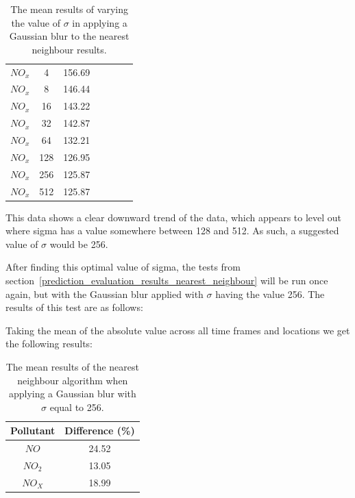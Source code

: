 \begin{table}[H]
\begin{tabular}{|c|c|c|c|c|c|c|}
						$NO_{x}$ & 4 & 156.69 \\
						$NO_{x}$ & 8 & 146.44 \\
						$NO_{x}$ & 16 & 143.22 \\
						$NO_{x}$ & 32 & 142.87 \\
						$NO_{x}$ & 64 & 132.21 \\
						$NO_{x}$ & 128 & 126.95 \\
						$NO_{x}$ & 256 & 125.87 \\
						$NO_{x}$ & 512 & 125.87 \\ \hline
					\end{tabular}
					\caption{The mean results of varying the value of $\sigma$ in applying a Gaussian blur to the nearest neighbour results.}
					\label{tab:nearest_neighbour_convolution_sigma_results}
				\end{table}
			\fi


			This data shows a clear downward trend of the data, which appears to level out where sigma has a value somewhere between 128 and 512. As such, a suggested value of $\sigma$ would be 256. 

			After finding this optimal value of sigma, the tests from section~\ref{prediction_evaluation_results_nearest_neighbour} will be run once again, but with the Gaussian blur applied with $\sigma$ having the value 256. The results of this test are as follows:


			Taking the mean of the absolute value across all time frames and locations we get the following results:

			\begin{table}[H]
				\centering
	    		\begin{tabular}{|c|c|}
	    			\hline
					Pollutant & Difference (\%) \\ \hline
					$NO$ & 24.52 \\
					$NO_{2}$ & 13.05 \\
					$NO_{X}$ & 18.99 \\
					\hline 
				\end{tabular}
				\caption{The mean results of the nearest neighbour algorithm when applying a Gaussian blur with $\sigma$ equal to 256.}
				\label{tab:nearest_neighbour_convolution_results}
			\end{table}

